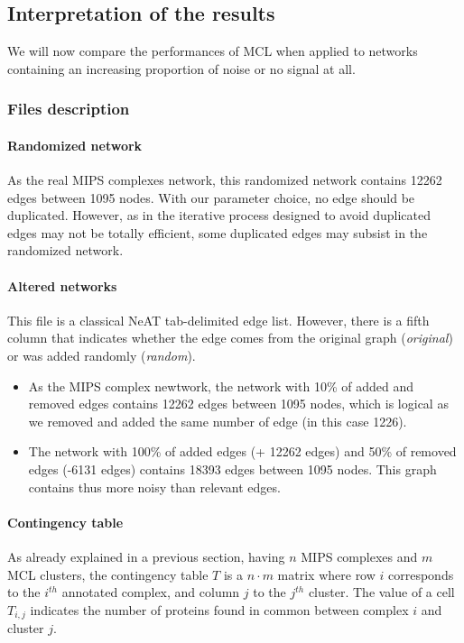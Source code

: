 \subsection{Interpretation of the results}

We will now compare the performances of MCL when applied to networks containing an increasing proportion of noise or no signal at all.

\subsubsection{Files description}

\paragraph{Randomized network}
As the real MIPS complexes network, this randomized network contains 12262 edges between 1095 nodes. With our parameter choice, no edge should be duplicated. However, as in  the iterative process designed to avoid duplicated edges may not be totally efficient, some duplicated edges may subsist in the randomized network. 

\paragraph{Altered networks}
  This file is a classical NeAT tab-delimited edge list. However, there is a fifth column that indicates
  whether the edge comes from the original graph (\textit{original}) or was added randomly (\textit{random}).
\begin{itemize}
 \item As the MIPS complex newtwork, the network with 10\% of added and removed edges contains 12262 edges between 1095 nodes, which is logical as we removed and added the same number of edge (in this case 1226).
 \item The network with 100\% of added edges (+ 12262 edges) and 50\% of removed edges (-6131 edges) contains 18393 edges between 1095 nodes. This graph contains thus more noisy than relevant edges.
\end{itemize}


\paragraph{Contingency table}
As already explained in a previous section, having $n$ MIPS complexes and $m$ MCL clusters, the contingency table $T$ is
a $n \cdot m$ matrix where row $i$ corresponds to the $i^{th}$
annotated complex, and column $j$ to the $j^{th}$ cluster. The value
of a cell $T_{i,j}$ indicates the number of proteins found in common
between complex $i$ and cluster $j$.

